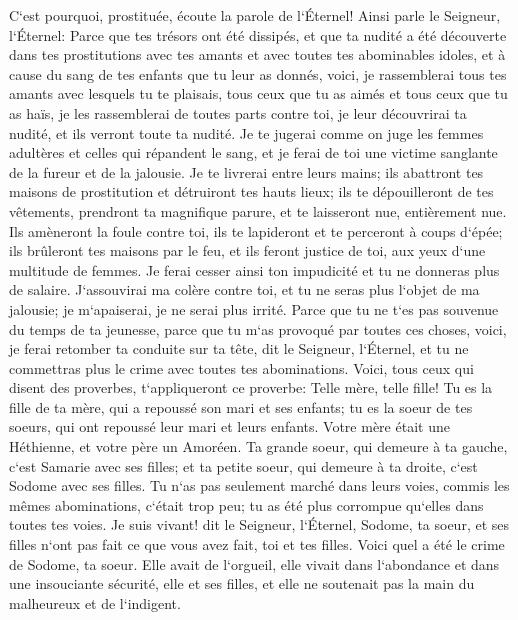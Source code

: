 \verse C`est pourquoi, prostituée, écoute la parole de l`Éternel! 
\verse Ainsi parle le Seigneur, l`Éternel: Parce que tes trésors ont été dissipés, et que ta nudité a été découverte dans tes prostitutions avec tes amants et avec toutes tes abominables idoles, et à cause du sang de tes enfants que tu leur as donnés, 
\verse voici, je rassemblerai tous tes amants avec lesquels tu te plaisais, tous ceux que tu as aimés et tous ceux que tu as haïs, je les rassemblerai de toutes parts contre toi, je leur découvrirai ta nudité, et ils verront toute ta nudité. 
\verse Je te jugerai comme on juge les femmes adultères et celles qui répandent le sang, et je ferai de toi une victime sanglante de la fureur et de la jalousie. 
\verse Je te livrerai entre leurs mains; ils abattront tes maisons de prostitution et détruiront tes hauts lieux; ils te dépouilleront de tes vêtements, prendront ta magnifique parure, et te laisseront nue, entièrement nue. 
\verse Ils amèneront la foule contre toi, ils te lapideront et te perceront à coups d`épée; 
\verse ils brûleront tes maisons par le feu, et ils feront justice de toi, aux yeux d`une multitude de femmes. Je ferai cesser ainsi ton impudicité et tu ne donneras plus de salaire. 
\verse J`assouvirai ma colère contre toi, et tu ne seras plus l`objet de ma jalousie; je m`apaiserai, je ne serai plus irrité. 
\verse Parce que tu ne t`es pas souvenue du temps de ta jeunesse, parce que tu m`as provoqué par toutes ces choses, voici, je ferai retomber ta conduite sur ta tête, dit le Seigneur, l`Éternel, et tu ne commettras plus le crime avec toutes tes abominations. 
\verse Voici, tous ceux qui disent des proverbes, t`appliqueront ce proverbe: Telle mère, telle fille! 
\verse Tu es la fille de ta mère, qui a repoussé son mari et ses enfants; tu es la soeur de tes soeurs, qui ont repoussé leur mari et leurs enfants. Votre mère était une Héthienne, et votre père un Amoréen. 
\verse Ta grande soeur, qui demeure à ta gauche, c`est Samarie avec ses filles; et ta petite soeur, qui demeure à ta droite, c`est Sodome avec ses filles. 
\verse Tu n`as pas seulement marché dans leurs voies, commis les mêmes abominations, c`était trop peu; tu as été plus corrompue qu`elles dans toutes tes voies. 
\verse Je suis vivant! dit le Seigneur, l`Éternel, Sodome, ta soeur, et ses filles n`ont pas fait ce que vous avez fait, toi et tes filles. 
\verse Voici quel a été le crime de Sodome, ta soeur. Elle avait de l`orgueil, elle vivait dans l`abondance et dans une insouciante sécurité, elle et ses filles, et elle ne soutenait pas la main du malheureux et de l`indigent. 
